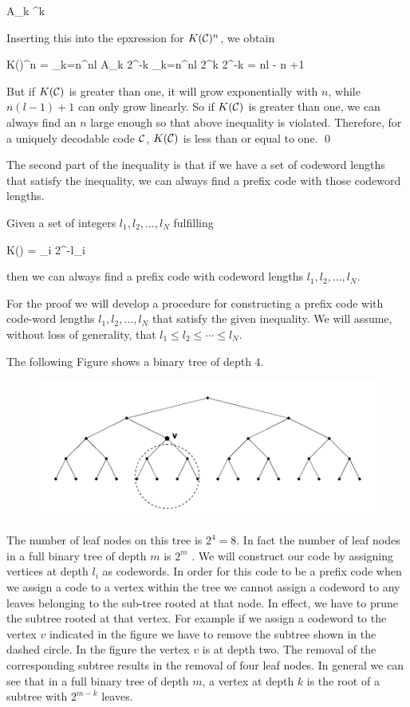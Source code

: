 \bee
A_k ^k
\eee

Inserting this into the epxression for $K(\mathcal{C})^n$, we obtain

\bee
K(\Cc)^n = \sum_{k=n}^{nl} A_k 2^{-k} \leq \sum_{k=n}^{nl} 2^k 2^{-k} = nl - n +1
\eee

But if $K(\mathcal{C})$ is greater than one, it will grow exponentially with $n$, while $n(l - 1) + 1$ can only grow linearly. So if $K(\mathcal{C})$ is greater than one, we can always find an $n$ large enough so that above inequality is violated. Therefore, for a uniquely decodable code $\mathcal{C}$, $K(\mathcal{C})$ is less than or equal to one. \qed

The second part of the inequality is that if we have a set of codeword lengths that satisfy the inequality, we can always find a prefix code with those codeword lengths.


Given a set of integers $l_1, l_2, \ldots, l_N$ fulfilling

\bee
    K(\Cc) = \sum_i 2^{-l_i} 
\eee

then we can always find a prefix code with codeword lengths $l_1, l_2, \ldots, l_N$.

For the proof we will develop a procedure for constructing a prefix code with code-word lengths $l_1 , l_2, \ldots, l_N$ that satisfy the given inequality. We will assume, without loss of generality, that $l_1 \leq l_2 \leq \cdots \leq l_N$. 


The following Figure shows a binary tree of depth $4$. 

\begin{figure}[H]
    \centering
    \includegraphics[scale=0.7]{images/2021-04-26-tree.png}
\end{figure}

The number of leaf nodes on this tree is $2^4 = 8$. In fact the number of leaf nodes in a full binary tree of depth $m$ is $2^m$ . We will construct our code by assigning vertices at depth $l_i$ as codewords. In order for this code to be a prefix code when we assign a code to a vertex within the tree we cannot assign a codeword to any leaves belonging to the sub-tree rooted at that node. In effect, we have to prune the subtree rooted at that vertex. For example if we assign a codeword to the vertex $v$ indicated in the figure we have to remove the subtree shown in the dashed circle. In the figure the vertex $v$ is at depth two. The removal of the corresponding subtree results in the removal of four leaf nodes. In general we can see that in a full binary tree of depth $m$, a vertex at depth $k$ is the root of a subtree with $2^{m-k}$ leaves.

